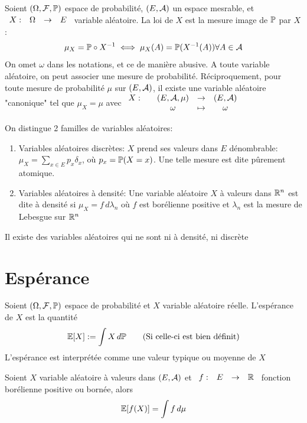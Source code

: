 \documentclass[]{report}
\begin{document}
    \begin{df}{}{}
        Soient $(\Omega,\mathcal{F},\mathbb{P})$ espace de probabilité, $(E,\mathcal{A})$ un espace mesrable, et $\begin{array}{ccccc} X : & \Omega & \to & E \end{array}$ variable aléatoire. La loi de $X$ est la mesure image de $\mathbb{P}$ par $X$:
        \[\mu_X=\mathbb{P}\circ X^{-1}\iff\mu_X(A)=\mathbb{P}(X^{-1}(A))\forall A\in \mathcal{A}\]
        On omet $\omega$ dans les notations, et ce de manière abusive. A toute variable aléatoire, on peut associer une mesure de probabilité. Réciproquement, pour toute mesure de probabilité $\mu$ sur $(E,\mathcal{A})$, il existe une variable aléatoire "canonique" tel que $\mu_X=\mu$ avec $\begin{array}{ccccc} X : & & (E,\mathcal{A},\mu) & \to & (E,\mathcal{A}) \\ & & \omega & \mapsto & \omega \end{array}$
    \end{df}

    On distingue 2 familles de variables aléatoires:\\
    \begin{enumerate}
        \item Variables aléatoires discrètes: $X$ prend ses valeurs dans $E$ dénombrable: $\mu_X=\sum_{x\in E}p_x\delta_x$, où $p_x=\mathbb{P}(X=x)$. Une telle mesure est dite pûrement atomique.
        \item Variables aléatoires à densité: Une variable aléatoire $X$ à valeurs dans $\mathbb{R}^n$ est dite à densité si $\mu_X=f\,d\lambda_n$ où $f$ est borélienne positive et $\lambda_n$ est la mesure de Lebesgue sur $\mathbb{R}^n$
    \end{enumerate}

    \begin{re}{}{}
        Il existe des variables aléatoires qui ne sont ni à densité, ni discrète
    \end{re}

    \section{Espérance}

    \begin{df}{}{}
        Soient $(\Omega,\mathcal{F},\mathbb{P})$ espace de probabilité et $X$ variable aléatoire réelle. L'espérance de $X$ est la quantité
        \[\mathbb{E}[X]:=\int X\,d\mathbb{P}\qquad \text{(Si celle-ci est bien définit)}\]
        L'espérance est interprétée comme une valeur typique ou moyenne de $X$
    \end{df}

    \begin{prop}{}{}
        Soient $X$ variable aléatoire à valeurs dans $(E,\mathcal{A})$ et $\begin{array}{ccccc} f : & E & \to & \mathbb{R} \end{array}$ fonction borélienne positive ou bornée, alors
        \[\mathbb{E}[f(X)]=\int f\,d\mu\]
    \end{prop}
\end{document}
